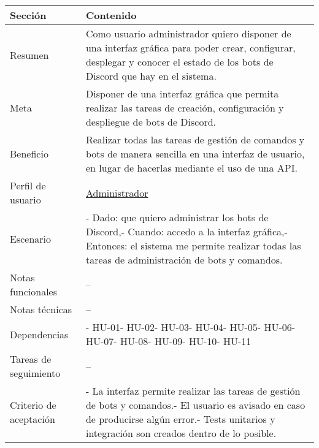 \begin{table}[H]
    \centering
    \begin{adjustbox}{max width=\textwidth}
    \begin{tabularx}{\textwidth}{|l|L|}
    \hline
        Sección & Contenido \\ \hline
        Resumen & Como usuario administrador quiero disponer de una interfaz gráfica para poder crear, configurar, desplegar y conocer el estado de los bots de Discord que hay en el sistema. \\ \hline
        Meta & Disponer de una interfaz gráfica que permita realizar las tareas de creación, configuración y despliegue de bots de Discord. \\ \hline
        Beneficio & Realizar todas las tareas de gestión de comandos y bots de manera sencilla en una interfaz de usuario, en lugar de hacerlas mediante el uso de una API. \\ \hline
        Perfil de usuario & \hyperref[sec:personaAdmin]{Administrador} \\ \hline
        Escenario & - Dado: que quiero administrar los bots de Discord,\linebreak - Cuando: accedo a la interfaz gráfica,\linebreak - Entonces: el sistema me permite realizar todas las tareas de administración de bots y comandos. \\ \hline
        Notas funcionales & – \\ \hline
        Notas técnicas & – \\ \hline
        Dependencias & - HU-01\linebreak - HU-02\linebreak - HU-03\linebreak - HU-04\linebreak - HU-05\linebreak - HU-06\linebreak - HU-07\linebreak - HU-08\linebreak - HU-09\linebreak - HU-10\linebreak - HU-11 \\ \hline
        Tareas de seguimiento & – \\ \hline
        Criterio de aceptación & - La interfaz permite realizar las tareas de gestión de bots y comandos.\linebreak - El usuario es avisado en caso de producirse algún error.\linebreak - Tests unitarios y integración son creados dentro de lo posible. \\ \hline
    \end{tabularx}
    \end{adjustbox}
\end{table}

